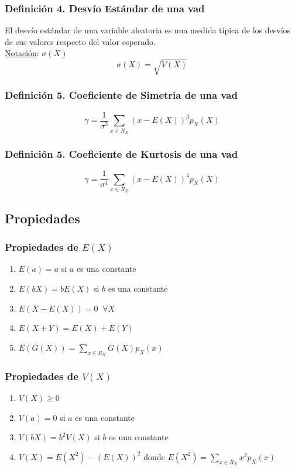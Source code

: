 \documentclass{article}
\newcommand{\sumatoria}[2]{\sum_{#1} ^{#2}}
\begin{document}
\subsubsection*{Definición 4. Desvío Estándar de una vad}
El desvío estándar de una variable aleatoria es una medida típica de los desvíos de sus valores respecto del valor esperado.
\\\underline{Notación}: $\sigma(X)$
\begin{equation*}
    \sigma(X) = \sqrt{V(X)}  
\end{equation*}

\subsubsection*{Definición 5. Coeficiente de Simetria de una vad}
\begin{equation*}
    \gamma = \frac{1}{\sigma^3} \sumatoria{x \in R_X}{} (x - E(X))^3 p_X(X)
\end{equation*}

\subsubsection*{Definición 5. Coeficiente de Kurtosis de una vad}
\begin{equation*}
    \gamma = \frac{1}{\sigma^4} \sumatoria{x \in R_X}{} (x - E(X))^4 p_X(X)
\end{equation*}

\subsection{Propiedades}
\subsubsection{Propiedades de $E(X)$}
\begin{enumerate}
    \item $E(a) = a$ si $a$ es una constante
    \item $E(b X) = b E(X)$ si $b$ es una constante
    \item $E(X - E(X)) = 0 \;\; \forall X$
    \item $E(X + Y) = E(X) + E(Y)$
    \item $E(G(X)) = \sumatoria{x \in R_X}{} G(X) p_X (x)$
\end{enumerate}

\subsubsection{Propiedades de $V(X)$}
\begin{enumerate}
    \item $V(X) \geq 0$
    \item $V(a) = 0$ si $a$ es una constante
    \item $V(b X) = b^2V(X)$ si $b$ es una constante
    \item $V(X) = E(X^2) - (E(X))^2$ donde $E(X^2) = \sumatoria{x \in R_X}{} x^2 p_X(x)$
\end{enumerate}
\end{document}
